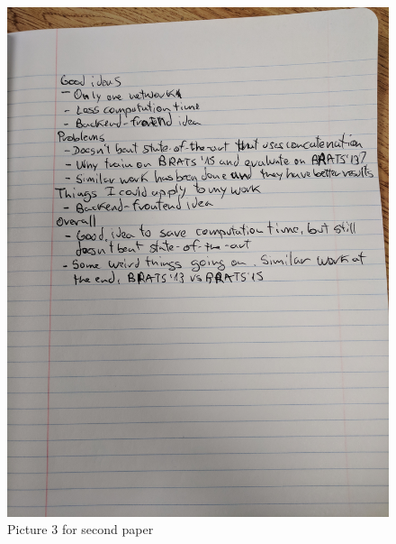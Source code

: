 \documentclass{article}
\begin{document}
\begin{figure}[h!]
\centering
\includegraphics[width=12cm]{paper2_3.jpg}
\caption{Picture 3 for second paper}
\label{fig:paper2_3}
\end{figure}






\clearpage

\nocite{*}

\printbibliography
\end{document}
